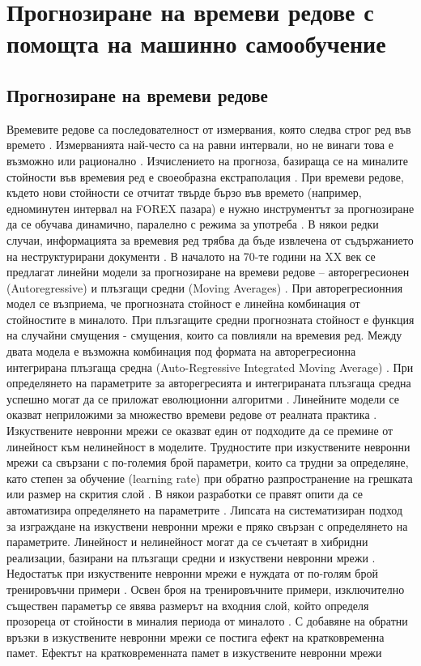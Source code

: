 \chapter{Прогнозиране на времеви редове с помощта на машинно самообучение}

\section{Прогнозиране на времеви редове}

Времевите редове са последователност от измервания, която следва строг ред във времето \cite{Oliveira-01}. Измерванията най-често са на равни интервали, но не винаги това е възможно или рационално \cite{Shen-01}. Изчислението на прогноза, базираща се на миналите стойности във времевия ред е своеобразна екстраполация \cite{Khashei-03}. При времеви редове, където нови стойности се отчитат твърде бързо във времето (например, едноминутен интервал на FOREX пазара) е нужно инструментът за прогнозиране да се обучава динамично, паралелно с режима за употреба \cite{Wagner-01}. В някои редки случаи, информацията за времевия ред трябва да бъде извлечена от съдържанието на неструктурирани документи \cite{Wang-01}. В началото на 70-те години на XX век \cite{Gooijer-01} се предлагат линейни модели за прогнозиране на времеви редове – авторегресионен (Autoregressive) и плъзгащи средни (Moving Averages) \cite{Tealab-01}. При авторегресионния модел се възприема, че прогнозната стойност е линейна комбинация от стойностите в миналото. При плъзгащите средни прогнозната стойност е функция на случайни смущения - смущения, които са повлияли на времевия ред. Между двата модела е възможна комбинация под формата на авторегресионна интегрирана плъзгаща средна (Auto-Regressive Integrated Moving Average) \cite{Khashei-01}. При определянето на параметрите за авторегресията и интегрираната плъзгаща средна успешно могат да се приложат еволюционни алгоритми \cite{Cortez-01}. Линейните модели се оказват неприложими за множество времеви редове от реалната практика \cite{Bontempi-01}. Изкуствените невронни мрежи се оказват един от подходите да се премине от линейност \cite{Zhang-03} към нелинейност в моделите. Трудностите при изкуствените невронни мрежи са свързани с по-големия брой параметри, които са трудни за определяне, като степен за обучение (learning rate) при обратно разпространение на грешката или размер на скрития слой \cite{Tang-01}. В някои разработки се правят опити да се автоматизира определянето на параметрите \cite{Yan-01}. Липсата на систематизиран подход за изграждане на изкуствени невронни мрежи \cite{Qi-01} е пряко свързан с определянето на параметрите. Линейност и нелинейност могат да се съчетаят в хибридни реализации, базирани на плъзгащи средни и изкуствени невронни мрежи \cite{Zhang-01}. Недостатък при изкуствените невронни мрежи е нуждата от по-голям брой тренировъчни примери \cite{Lachtermacher-01}. Освен броя на тренировъчните примери, изключително съществен параметър се явява размерът на входния слой, който определя прозореца от стойности в миналия периода от миналото \cite{Chen-01}. С добавяне на обратни връзки в изкуствените невронни мрежи се постига ефект на кратковременна памет. Ефектът на кратковременната памет в изкуствените невронни мрежи 